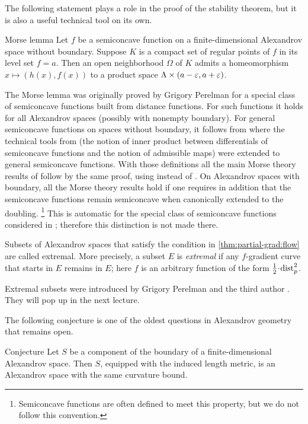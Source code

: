 The following statement plays a role in the proof of the stability theorem,
but it is also a useful technical tool on its own.

\begin{thm}{Morse lemma}
Let $f$ be a semiconcave function on a finite-dimensional Alexandrov space without boundary.
Suppose $K$ is a compact set of regular points of $f$ in its level set $f=a$.
Then an open neighborhood $\Omega$ of $K$ admits a homeomorphism $x\mapsto (h(x),f(x))$ to a product space $\Lambda\times (a-\varepsilon,a+\varepsilon)$.
\end{thm}

The Morse lemma was originally proved by Grigory Perelman \cite{perelman1993} for a special class of semiconcave functions built from distance functions.
For such functions it holds for all Alexandrov spaces (possibly with nonempty boundary).
For general semiconcave functions on spaces without boundary, it follows from \cite{perelman1994} where the technical tools from \cite{perelman1993} (the notion of inner product between differentials of semiconcave functions and the notion of admissible maps) were extended to general semiconcave functions.
With those definitions all the main Morse theory results of \cite{perelman1993} follow by the same proof, using \cite[2.2]{perelman1994} instead of \cite[Lemma 1]{perelman1993}.
On Alexandrov spaces with boundary, all the Morse theory results hold if one requires in addition that the semiconcave functions remain semiconcave when canonically extended to the doubling.%
\footnote{Semiconcave functions are often defined to meet this property, but we do not follow this convention.}
This is automatic for the special class of semiconcave functions considered in \cite{perelman1993}; therefore this distinction is not made there.

Subsets of Alexandrov spaces that satisfy the condition in \ref{thm:partial-grad:flow} are called extremal.
More precisely, a subset $E$ is \emph{extremal} if any $f$-gradient curve that starts in $E$ remains in $E$;
here $f$ is an arbitrary function of the form $\tfrac12\cdot \distfun_p^2$.

Extremal subsets were introduced by Grigory Perelman and the third author \cite{perelman-petrunin}.
They will pop up in the next lecture.

The following conjecture is one of the oldest questions in Alexandrov geometry that remains open.

\begin{thm}{Conjecture}\label{conj:bry}
Let $S$ be a component of the boundary of a finite-dimensional Alexandrov space.
Then $S$, equipped with the induced length metric, is an Alexandrov space with the same curvature bound.
\end{thm}
